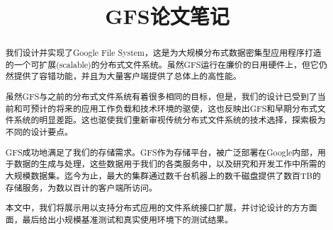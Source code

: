 \documentclass{article}
\begin{document}
\title{GFS论文笔记}
\date{}
\maketitle

\begin{abstract}
我们设计并实现了Google File System，这是为大规模分布式数据密集型应用程序打造的一个可扩展(scalable)的分布式文件系统。虽然GFS运行在廉价的日用硬件上，但它仍然提供了容错功能，并且为大量客户端提供了总体上的高性能。\par
虽然GFS与之前的分布式文件系统有着很多相同的目标，但是，我们的设计已受到了当前和可预计的将来的应用工作负载和技术环境的驱使，这也反映出GFS和早期分布式文件系统的明显差距。这也驱使我们重新审视传统分布式文件系统的技术选择，探索极为不同的设计要点。\par
GFS成功地满足了我们的存储需求。GFS作为存储平台，被广泛部署在Google内部，用于数据的生成与处理，这些数据用于我们的各类服务中，以及研究和开发工作中所需的大规模数据集。迄今为止，最大的集群通过数千台机器上的数千磁盘提供了数百TB的存储服务，为数以百计的客户端所访问。\par
本文中，我们将展示用以支持分布式应用的文件系统接口扩展，并讨论设计的方方面面，最后给出小规模基准测试和真实使用环境下的测试结果。
\end{abstract}
\end{document}
